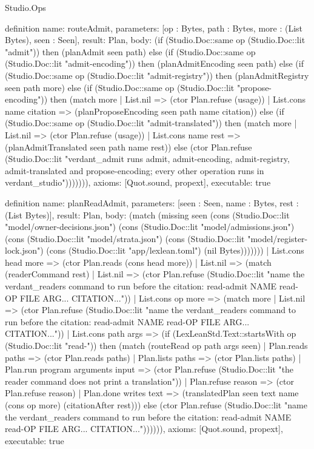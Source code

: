 \begin{lexlean}{Studio.Ops}
\begin{semanticmodule}
{definition{
  name: routeAdmit,
  parameters: [op : Bytes, path : Bytes, more : (List Bytes), seen : Seen],
  result: Plan,
  body: (if (Studio.Doc::same op (Studio.Doc::lit "admit")) then (planAdmit seen path) else
    (if (Studio.Doc::same op (Studio.Doc::lit "admit-encoding")) then (planAdmitEncoding seen path) else
    (if (Studio.Doc::same op (Studio.Doc::lit "admit-registry")) then (planAdmitRegistry seen path more) else
    (if (Studio.Doc::same op (Studio.Doc::lit "propose-encoding")) then (match more
      | List.nil => (ctor Plan.refuse (usage))
      | List.cons name citation => (planProposeEncoding seen path name citation)) else
    (if (Studio.Doc::same op (Studio.Doc::lit "admit-translated")) then (match more
      | List.nil => (ctor Plan.refuse (usage))
      | List.cons name rest => (planAdmitTranslated seen path name rest)) else
    (ctor Plan.refuse (Studio.Doc::lit "verdant_admit runs admit, admit-encoding, admit-registry, admit-translated and propose-encoding; every other operation runs in verdant_studio\n"))))))),
  axioms: [Quot.sound, propext],
  executable: true
}

definition{
  name: planReadAdmit,
  parameters: [seen : Seen, name : Bytes, rest : (List Bytes)],
  result: Plan,
  body: (match (missing seen (cons (Studio.Doc::lit "model/owner-decisions.json") (cons (Studio.Doc::lit "model/admissions.json") (cons (Studio.Doc::lit "model/strata.json") (cons (Studio.Doc::lit "model/register-lock.json") (cons (Studio.Doc::lit "app/lexlean.toml") (nil Bytes)))))))
    | List.cons head more => (ctor Plan.reads (cons head more))
    | List.nil => (match (readerCommand rest)
      | List.nil => (ctor Plan.refuse (Studio.Doc::lit "name the verdant_readers command to run before the citation: read-admit NAME read-OP FILE ARG... CITATION...\n"))
      | List.cons op more => (match more
        | List.nil => (ctor Plan.refuse (Studio.Doc::lit "name the verdant_readers command to run before the citation: read-admit NAME read-OP FILE ARG... CITATION...\n"))
        | List.cons path args => (if (LexLeanStd.Text::startsWith op (Studio.Doc::lit "read-")) then (match (routeRead op path args seen)
          | Plan.reads paths => (ctor Plan.reads paths)
          | Plan.lists paths => (ctor Plan.lists paths)
          | Plan.run program arguments input => (ctor Plan.refuse (Studio.Doc::lit "the reader command does not print a translation\n"))
          | Plan.refuse reason => (ctor Plan.refuse reason)
          | Plan.done writes text => (translatedPlan seen text name (cons op more) (citationAfter rest))) else (ctor Plan.refuse (Studio.Doc::lit "name the verdant_readers command to run before the citation: read-admit NAME read-OP FILE ARG... CITATION...\n")))))),
  axioms: [Quot.sound, propext],
  executable: true
}

}
\end{semanticmodule}
\end{lexlean}
